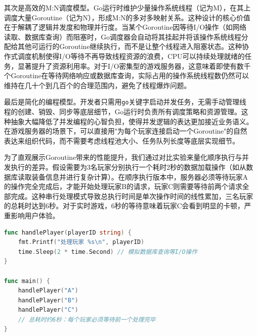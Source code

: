 其次是高效的M:N调度模型。Go运行时维护少量操作系统线程（记为M），在其上调度大量Goroutine（记为N），形成M:N的多对多映射关系。这种设计的核心价值在于解耦了逻辑并发度和物理并行度。当某个Goroutine因等待I/O操作（如网络读取、数据库查询）而阻塞时，Go调度器会自动将其挂起并将该操作系统线程分配给其他可运行的Goroutine继续执行，而不是让整个线程进入阻塞状态。这种协作式调度机制使得I/O等待不再导致线程资源的浪费，CPU可以持续处理就绪的任务，显著提升了资源利用率。对于I/O密集型的游戏服务器，这意味着即使有数千个Goroutine在等待网络响应或数据库查询，实际占用的操作系统线程数仍然可以维持在几十个到几百个的合理范围内，避免了线程爆炸问题。

最后是简化的编程模型。开发者只需用\texttt{go}关键字启动并发任务，无需手动管理线程的创建、销毁、同步等底层细节，Go运行时负责所有调度策略和资源管理。这种抽象大幅降低了并发编程的心智负担，使得并发逻辑的表达更加接近业务语义。在游戏服务器的场景下，可以直接用"为每个玩家连接启动一个Goroutine"的自然表达来组织代码，而不需要考虑线程池大小、任务队列长度等底层实现细节。

为了直观展示Goroutine带来的性能提升，我们通过对比实验来量化顺序执行与并发执行的差异。假设需要为3名玩家分别执行一个耗时2秒的数据加载操作（如从数据库读取装备信息并进行复杂计算）。在顺序执行版本中，服务器必须等待玩家A的操作完全完成后，才能开始处理玩家B的请求，玩家C则需要等待前两个请求全部完成。这种串行处理模式导致总执行时间是单次操作时间的线性累加，三名玩家的总耗时达到6秒。对于实时游戏，6秒的等待意味着玩家C会看到明显的卡顿，严重影响用户体验。



\begin{tcolorbox}[title=顺序执行模式的性能瓶颈]
\begin{lstlisting}[style=codeblock, language=go]
func handlePlayer(playerID string) {
    fmt.Printf("处理玩家 %s\n", playerID)
    time.Sleep(2 * time.Second) // 模拟数据库查询等I/O操作
}

func main() {
    handlePlayer("A")
    handlePlayer("B")
    handlePlayer("C")
    // 总耗时约6秒：每个玩家必须等待前一个处理完毕
}
\end{lstlisting}
\end{tcolorbox}

